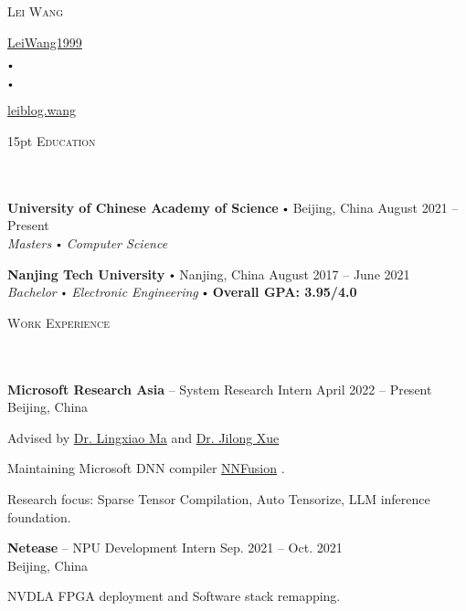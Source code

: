 \documentclass{article}
\newcommand{\contact}[3]{
\vspace*{5pt}
\begin{center}
{\LARGE \scshape {#1}}\\
\vspace{3pt}
#2 
\vspace{2pt}
#3
\end{center}
\vspace*{-8pt}
}
\newcommand{\header}[1]{{
\hspace*{-15pt}\vspace*{6pt} \textsc{#1}} \vspace*{-6pt} 
\lineunder
}
\newcommand{\lineunder}{
\vspace*{-8pt} \\ \hspace*{-18pt} 
\hrulefill \\
}
\newcommand{\school}[4]{
\textbf{#1} \labelitemi #2 \hfill #3 \\ #4 \vspace*{5pt}
}
\newcommand{\employer}[4]{{
\vspace*{2pt}%
\textbf{#1} #2 \hfill #3\\ #4 \vspace*{2pt}}
}
\renewcommand{\labelitemi}{
$\vcenter{\hbox{\tiny$\bullet$}}$\hspace*{3pt}
}
\renewcommand{\labelitemii}{
$\vcenter{\hbox{\tiny$\bullet$}}$\hspace*{-3pt}
}
\newcommand{\myhref}[2]{%
\href{#1}{\textcolor{ColorTwo}{#2}}
}
\newenvironment{bullet-list-minor}{
\begin{list}{\labelitemii}{\setlength\leftmargin{15pt} 
\topsep 0pt \itemsep -2pt}}{\vspace*{4pt}\end{list}
}
\begin{document}
\small
\smallskip
\vspace*{-44pt}

\contact{Lei Wang}
{
\textcolor{ColorTwo}{\faGithub} 
\myhref{https://github.com/LeiWang1999}{LeiWang1999} 
\labelitemi 
\textcolor{ColorTwo}{\faEnvelopeO} 
\myhref{mailto:leiwang1999@outlook.com}
\labelitemi
\textcolor{ColorTwo}{\faChain} 
\myhref{https://leiblog.wang}{leiblog.wang}
}

\vspace{15pt}
\header{Education}
    \school{University of Chinese Academy of Science}{Beijing, China}{August 2021 -- Present}
    {\textit{Masters \labelitemi Computer Science}}

    \school{Nanjing Tech University}{Nanjing, China}{August 2017 -- June 2021}
    {\textit{Bachelor \labelitemi Electronic Engineering} \labelitemi \textcolor{ColorOne}{\textbf{Overall GPA: 3.95/4.0}}}

\vspace*{4pt}%
\header{Work Experience}
    \employer{Microsoft Research Asia}{-- System Research Intern}{April 2022 -- Present}{Beijing, China}
	\begin{bullet-list-minor}
	\item Advised by \myhref{https://xysmlx.github.io/}{Dr. Lingxiao Ma} and \myhref{https://www.microsoft.com/en-us/research/people/jxue/}{Dr. Jilong Xue}
	\item Maintaining Microsoft DNN compiler \myhref{https://github.com/microsoft/nnfusion}{NNFusion}.
	\item Research focus: Sparse Tensor Compilation, Auto Tensorize, LLM inference foundation.   
    \end{bullet-list-minor}

    \employer{Netease}{-- NPU Development Intern}{Sep. 2021 -- Oct. 2021}{Beijing, China}
	\begin{bullet-list-minor}
	\item NVDLA FPGA deployment and Software stack remapping.
    \end{bullet-list-minor}
\end{document}
